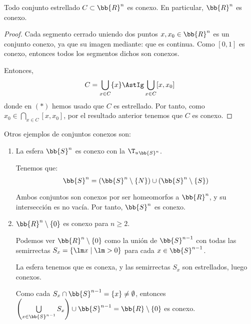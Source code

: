 \begin{prop}
    Todo conjunto estrellado $C\subset \bb{R}^n$ es conexo. En particular, $\bb{R}^n$ es conexo.
\end{prop}
\begin{proof}
    Cada segmento cerrado uniendo dos puntos $x,x_0\in \bb{R}^n$ es un conjunto conexo, ya que su imagen mediante:
    que es continua. Como $[0,1]$ es conexo, entonces todos los segmentos dichos son conexos.

    Entonces,
    \begin{equation*}
        C = \bigcup_{x\in C}\{x\} \AstIg \bigcup_{x\in C}[x,x_0]
    \end{equation*}
    donde en $(\ast)$ hemos usado que $C$ es estrellado. Por tanto, como $x_0\in \bigcap_{x\in C}[x,x_0]$, por el resultado anterior tenemos que $C$ es conexo.
\end{proof}

\begin{ejemplo}
    Otros ejemplos de conjuntos conexos son:
    \begin{enumerate}
        \item La esfera $\bb{S}^n$ es conexo con la ${\T_u}_{\bb{S}^n}$.

        Tenemos que:
        \begin{equation*}
            \bb{S}^n=(\bb{S}^n\setminus \{N\}) \cup (\bb{S}^n\setminus \{S\})
        \end{equation*}
    
        Ambos conjuntos son conexos por ser homeomorfos a $\bb{R}^n$, y su intersección es no vacía. Por tanto, $\bb{S}^n$ es conexo.

        \item $\bb{R}^n \setminus \{0\}$ es conexo para $n\geq 2$.

        Podemos ver $\bb{R}^n\setminus \{0\}$ como la unión de $\bb{S}^{n-1}$ con todas las semirrectas $S_x = \{\lm x \mid \lm > 0\}$ para cada $x\in \bb{S}^{n-1}$.

        La esfera tenemos que es conexa, y las semirrectas $S_x$ son estrellados, luego conexos.

        Como cada $S_x\cap \bb{S}^{n-1}=\{x\}\neq \emptyset$, entonces $\left(\bigcup\limits_{x\in \bb{S}^{n-1}}S_x\right)\cup \bb{S}^{n-1}=\bb{R}\setminus \{0\}$ es conexo.
    \end{enumerate}
\end{ejemplo}


